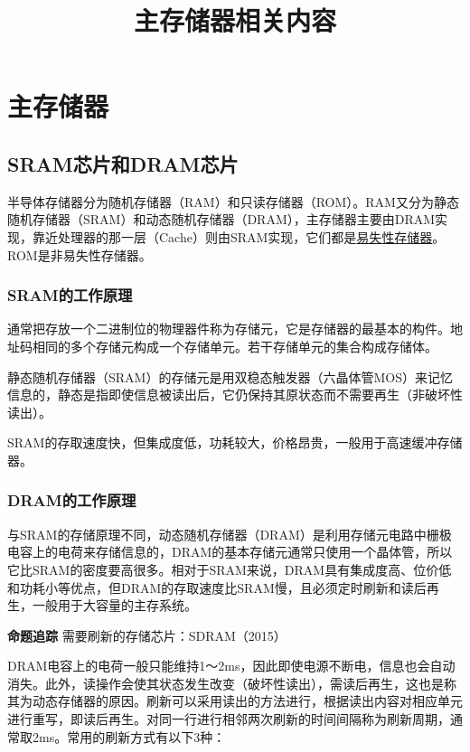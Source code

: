 \documentclass[UTF8]{ctexart}
\title{主存储器相关内容}
\author{}
\date{}
\begin{document}
	\maketitle
	\tableofcontents
	\newpage
	\section{主存储器}
	\subsection{SRAM芯片和DRAM芯片}
	半导体存储器分为随机存储器（RAM）和只读存储器（ROM）。RAM又分为静态随机存储器（SRAM）和动态随机存储器（DRAM），主存储器主要由DRAM实现，靠近处理器的那一层（Cache）则由SRAM实现，它们都是\underline{易失性存储器}。ROM是非易失性存储器。
	
	\subsubsection{SRAM的工作原理}
	通常把存放一个二进制位的物理器件称为存储元，它是存储器的最基本的构件。地址码相同的多个存储元构成一个存储单元。若干存储单元的集合构成存储体。
	
	静态随机存储器（SRAM）的存储元是用双稳态触发器（六晶体管MOS）来记忆信息的，静态是指即使信息被读出后，它仍保持其原状态而不需要再生（非破坏性读出）。
	
	SRAM的存取速度快，但集成度低，功耗较大，价格昂贵，一般用于高速缓冲存储器。
	
	\subsubsection{DRAM的工作原理}
	与SRAM的存储原理不同，动态随机存储器（DRAM）是利用存储元电路中栅极电容上的电荷来存储信息的，DRAM的基本存储元通常只使用一个晶体管，所以它比SRAM的密度要高很多。相对于SRAM来说，DRAM具有集成度高、位价低和功耗小等优点，但DRAM的存取速度比SRAM慢，且必须定时刷新和读后再生，一般用于大容量的主存系统。
	
	\begin{tcolorbox}[colframe=black, colback=white]
	\kaishu	\textbf{命题追踪} \quad 需要刷新的存储芯片：SDRAM（2015）
	\end{tcolorbox}
	
	DRAM电容上的电荷一般只能维持1～2ms，因此即使电源不断电，信息也会自动消失。此外，读操作会使其状态发生改变（破坏性读出），需读后再生，这也是称其为动态存储器的原因。刷新可以采用读出的方法进行，根据读出内容对相应单元进行重写，即读后再生。对同一行进行相邻两次刷新的时间间隔称为刷新周期，通常取2ms。常用的刷新方式有以下3种：
	
\end{document}
